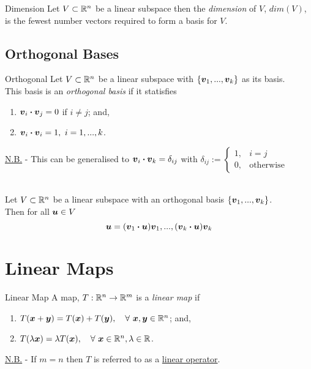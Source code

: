 \documentclass[11pt,a4paper]{article}
\begin{document}
\subtitle{Definition 4.07 - }{Dimension}
Let $V \subset \mathbb{R}^n$ be a linear subspace then the \textit{dimension} of $V$, $dim(V)$, is the fewest number vectors required to form a basis for $V$.

\subsection{Orthogonal Bases}
%
\subtitle{Definition 4.08 - }{Orthogonal}
Let $V \subset \mathbb{R}^n$ be a linear subspace with $\{\boldsymbol{v}_1 , ... , \boldsymbol{v}_k\}$ as its basis.\\
This basis is an \textit{orthogonal basis} if it statisfies
\begin{enumerate}[label=\roman*)]
  \item $\boldsymbol{v}_i \boldsymbol{\cdot} \boldsymbol{v}_j = 0$ if $i \not = j$; and,
  \item $\boldsymbol{v}_i \boldsymbol{\cdot} \boldsymbol{v}_i = 1,\ i = 1, ... , k$.
\end{enumerate}
\underline{N.B.} - This can be generalised to $\boldsymbol{v}_i \boldsymbol{\cdot} \boldsymbol{v}_k = \delta_{ij}$ with $\delta_{ij} := \begin{cases} 1, & i = j \\ 0, & \mathrm{otherwise}\end{cases}$\\\\

\subtitle{Theorem 4.09}{}
Let $V \subset \mathbb{R}^n$ be a linear subspace with an orthogonal basis $\{\boldsymbol{v}_1 , ... , \boldsymbol{v}_k\}$. \\
Then for all $\boldsymbol{u} \in V$ $$\boldsymbol{u} = (\boldsymbol{v}_1 \boldsymbol{\cdot} \boldsymbol{u}) \boldsymbol{v}_1 , ... , (\boldsymbol{v}_k \boldsymbol{\cdot} \boldsymbol{u}) \boldsymbol{v}_k$$

\section{Linear Maps}

\subtitle{Definition 5.01 - }{Linear Map}
A map, $T : \mathbb{R}^n \to \mathbb{R}^m$ is a \textit{linear map} if
\begin{enumerate}[label=\roman*)]
  \item $T(\boldsymbol{x} + \boldsymbol{y}) = T(\boldsymbol{x}) + T(\boldsymbol{y}),\quad \forall\ \boldsymbol{x}, \boldsymbol{y} \in \mathbb{R}^n$; and,
  \item $T(\lambda\boldsymbol{x}) = \lambda T(\boldsymbol{x}),\quad \forall\ \boldsymbol{x} \in \mathbb{R}^n, \lambda \in \mathbb{R}$.
\end{enumerate}
\underline{N.B.} - If $m = n$ then $T$ is referred to as a \underline{linear operator}. \\
\end{document}
